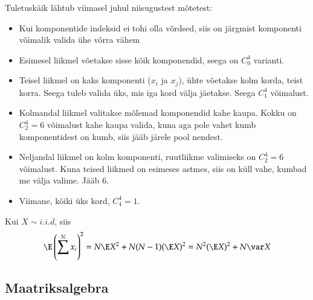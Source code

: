 \documentclass[a4paper]{article}
\numberwithin{equation}{subsection}
\begin{document}
Tuletuskäik lähtub viimasel juhul niisugustest mõtetest:
\begin{itemize}
\item Kui komponentide indeksid ei tohi olla võrdsed, siis on järgmist
komponenti võimalik valida ühe võrra vähem
\item Esimesel liikmel võetakse sisse kõik komponendid, seega on
$C_0^4$ varianti.
\item Teisel liikmel on kaks komponenti ($x_i$ ja $x_j$), ühte
võetakse kolm korda, teist korra.  Seega tuleb valida üks, mis iga
kord välja jäetakse.  Seega $C_1^4$ võimalust.
\item Kolmandal liikmel valitakse mõlemad komponendid kahe kaupa.
Kokku on $C_2^4=6$ võimalust kahe kaupa valida, kuna aga pole vahet
kumb komponentidest on kumb, siis jääb järele pool nendest.
\item Neljandal liikmel on kolm komponenti, ruutliikme valimiseks on
$C_2^4=6$ võimalust.  Kuna teised liikmed on esimeses astmes, siis on
küll vahe, kumbad me välja valime.  Jääb 6.
\item Viimane, kõiki üks kord, $C_4^4=1$.
\end{itemize}

Kui $X \sim i.i.d$, siis
\begin{equation}
  \label{eq:E(sum x)^2}
  \E \left( \sum^N x_i \right)^2 =
  N \E X^2 + N(N - 1) (\E X)^2 =
  N^2 (\E X)^2 + N \var X
\end{equation}



\newpage
\subsection{Maatriksalgebra}
\end{document}
